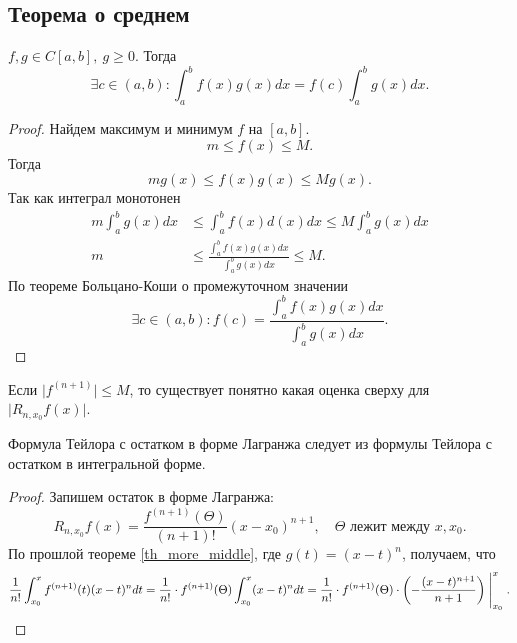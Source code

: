 \documentclass[11pt,dvipsnames]{report}
\begin{document}
\subsection{Теорема о среднем}
\begin{thm}\label{th_more_middle}
    $ f, g \in  C[a, b], ~ g \ge 0$. Тогда 
    \[
	\exists c \in (a, b): \int_{a}^{b} f(x) g(x) dx = f(c) \int_{a}^{b} g(x) dx  
    .\] 
\end{thm}
\begin{proof}
    Найдем максимум и минимум $ f$ на $ [a, b]$. \[
	m \le f(x) \le M
    .\] 
    Тогда \[
	m g(x) \le f(x) g(x) \le M g(x)
    .\] 
    Так как интеграл монотонен
    \begin{align*}
	m \int_{a}^{b} g(x) dx & \le  \int_{a}^{b} f(x) d(x) dx \le M \int_{a}^{b} g(x) dx   
	\\
	m &\le  \frac{\int_{a}^{b} f(x)g(x)dx}{\int_{a}^{b} g(x)dx } \le M 
	.
    \end{align*}
    По теореме Больцано-Коши о промежуточном значении 
    \[
	\exists c \in (a, b): f(c) = \frac{\int_{a}^{b} f(x)g(x)dx}{\int_{a}^{b} g(x)dx } 
    .\] 
\end{proof}
\begin{cor}
    Если $ \lvert f^{(n+1)} \rvert \le M$, то существует понятно какая оценка сверху для $ \lvert R_{n, x_0} f(x) \rvert$.
\end{cor}
\begin{thm}
    Формула Тейлора с остатком в форме Лагранжа следует из формулы Тейлора с остатком в интегральной форме.
\end{thm}
\begin{proof}
    Запишем остаток в форме Лагранжа:
    \[
	R_{n, x_0} f(x) = \frac{f^{(n+1)}(\Theta)}{(n+1)!} (x-x_0)^{n+1}, \quad \Theta \text{ лежит между } x, x_0
    .\] 
    По прошлой теореме \ref{th_more_middle}, где $ g(t) = (x-t)^{n}$, получаем, что
    \[
	\frac{1}{n!} \int_{x_0}^{x} f^{(n+1)} (t)(x-t)^{n} dt = \frac{1}{n!} \cdot f^{(n+1)}(\Theta) \int_{x_0}^{x} (x-t)^{n}dt = \frac{1}{n!} \cdot f^{(n+1)}(\Theta) \cdot \left(-\frac{  (x-t)^{n+1}}{n+1} \right) \Biggm |_{x_0}^{x}
    .\] 
\end{proof}
\end{document}
